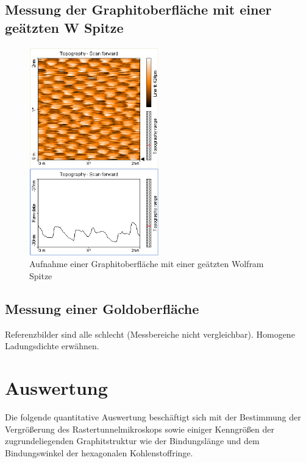 \documentclass[10pt, a4paper]{article}
\begin{document}
\subsection{Messung der Graphitoberfläche mit einer geätzten W Spitze}
\begin{figure}[h]
\centering
\includegraphics[width=0.5\textwidth]{./grafiken/originale/ref_graphit_w_2nm.png}
\caption{Aufnahme einer Graphitoberfläche mit einer geätzten Wolfram Spitze}
\label{fig:ref_w}
\end{figure}

\subsection{Messung einer Goldoberfläche}
Referenzbilder sind alle schlecht (Messbereiche nicht vergleichbar).
Homogene Ladungsdichte erwähnen.

\section{Auswertung}
Die folgende quantitative Auswertung beschäftigt sich mit der Bestimmung der Vergrößerung des Rastertunnelmikroskops sowie einiger Kenngrößen der zugrundeliegenden Graphitstruktur wie der Bindungslänge und dem Bindungswinkel der hexagonalen Kohlenstoffringe.
\end{document}
